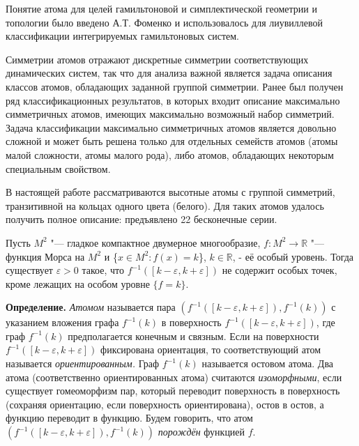 \vzmscaption

Понятие атома для целей гамильтоновой и симплектической геометрии и топологии было введено А.Т. Фоменко и использовалось для лиувиллевой классификации интегрируемых гамильтоновых систем.


Симметрии атомов отражают дискретные симметрии соответствующих динамических систем, так что для анализа важной является задача описания классов атомов, обладающих заданной группой симметрии. Ранее был получен ряд классификационных результатов, в которых входит описание максимально симметричных атомов, имеющих максимально возможный набор симметрий. Задача классификации максимально симметричных атомов является довольно сложной и может быть решена только для отдельных семейств атомов (атомы малой сложности, атомы малого рода), либо атомов, обладающих некоторым специальным свойством.

В настоящей работе рассматриваются высотные атомы с группой симметрий, транзитивной на кольцах одного цвета (белого). Для таких атомов удалось получить полное описание: предъявлено 22 бесконечные серии.




Пусть $M^2$ "--- гладкое компактное двумерное многообразие, $f:M^2 \to \mathbb{R}$ "--- функция Морса	на $M^2$ и \{$x\in M^2 \colon f(x)=k $\}, $k \in \mathbb{R}$, - её особый уровень. Тогда существует ${\varepsilon > 0}$ такое, что ${f^{-1}([k-\varepsilon, k+\varepsilon ])}$ не содержит особых точек, кроме лежащих на особом уровне $\{f=k\}$.



		{\bf Определение.}
		{\em Атомом} называется пара ${(f^{-1}([k-\varepsilon, k+\varepsilon ]), f^{-1}(k))}$ с указанием вложения графа ${f^{-1}(k)}$ в поверхность ${f^{-1}([k-\varepsilon, k+\varepsilon ])}$, где граф ${f^{-1}(k)}$ предполагается конечным и связным. Если на поверхности ${f^{-1}([k-\varepsilon, k+\varepsilon ])}$ фиксирована ориентация, то соответствующий атом называется {\em ориентированным.} Граф ${f^{-1}(k)}$ называется остовом атома. Два атома (соответственно ориентированных атома) считаются {\em изоморфными}, если существует гомеоморфизм пар, который переводит поверхность в поверхность (сохраняя ориентацию, если поверхность ориентирована), остов в остов, а функцию переводит в функцию. Будем говорить, что атом
${(f^{-1}([k-\varepsilon, k+\varepsilon ]),f^{-1}(k))}$ {\em порождён} функцией $f$.




